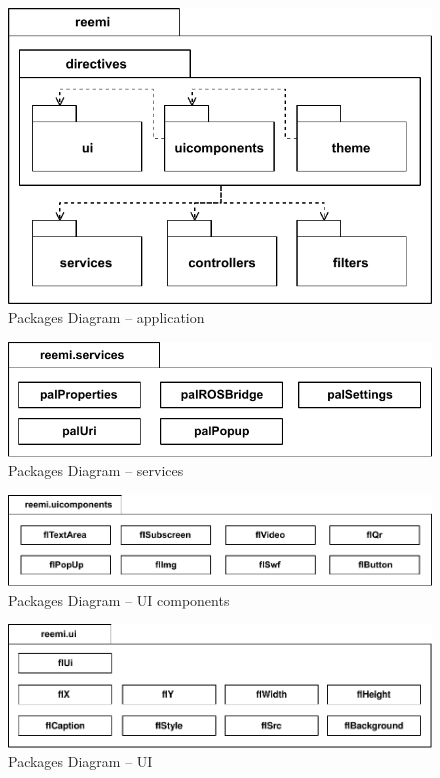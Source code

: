 \begin{figure}[htb]
    \centering
    \includegraphics{figures/design-package-reemi.pdf}
    \caption{Packages Diagram -- application}
    \label{fig:pkg-reemi}
\end{figure}

\begin{figure}[htb]
    \centering
    \includegraphics{figures/design-package-services.pdf}
    \caption{Packages Diagram -- services}
    \label{fig:pkg-services}
\end{figure}

\begin{figure}[htb]
    \centering
    \includegraphics{figures/design-package-uicomponents.pdf}
    \caption{Packages Diagram -- UI components}
    \label{fig:pkg-uicomponents}
\end{figure}

\begin{figure}[htb]
    \centering
    \includegraphics{figures/design-package-ui.pdf}
    \caption{Packages Diagram -- UI}
    \label{fig:pkg-ui}
\end{figure}

